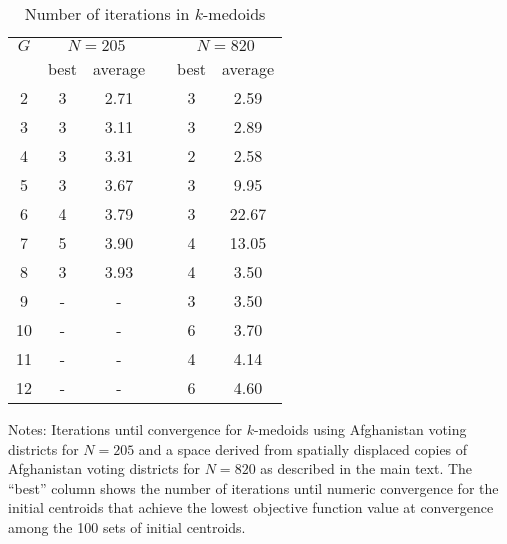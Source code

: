 \documentclass[preprint]{imsart}
\numberwithin{equation}{section}
\theoremstyle{plain}
\theoremstyle{definition}
\renewcommand{\(}{\left(}
\renewcommand{\)}{\right)}
\renewcommand{\[}{\left[}
\renewcommand{\]}{\right]}
\begin{document}
{\begin{table}[ht!]
\begin{threeparttable}
\begin{tablenotes}
	\end{tablenotes}
\end{threeparttable}
\end{table}



\begin{table}[ht!]
	\centering
	\renewcommand{\arraystretch}{1.5}
	\caption{Number of iterations in $k$-medoids}
	 \label{kmedoidsiterations}
	\begin{threeparttable}
	\begin{tabular}{cccccc}
		\hline
		\hline
$G$	& \multicolumn{2}{c}{$N=205$} & & \multicolumn{2}{c}{$N=820$}  \\
 \cline{2-3}\cline{5-6}
& best & average & & best & average \\
		\hline
2  & 3 & 2.71 &  & 3 & 2.59  \\
3  & 3 & 3.11 &  & 3 & 2.89  \\
4  & 3 & 3.31 &  & 2 & 2.58  \\
5  & 3 & 3.67 &  & 3 & 9.95  \\
6  & 4 & 3.79 &  & 3 & 22.67 \\
7  & 5 & 3.90 &  & 4 & 13.05 \\
8  & 3 & 3.93 &  & 4 & 3.50  \\
9  & -  &    -  &  & 3 & 3.50  \\
10 &  - &   -   &  & 6 & 3.70  \\
11 &  - &   -   &  & 4 & 4.14  \\
12 &  - & -     &  & 6 & 4.60 \\
\hline
	\end{tabular}
\begin{tablenotes}
\item Notes:  Iterations until convergence for $k$-medoids using Afghanistan voting districts for $N=205$ and a space derived from spatially displaced copies of Afghanistan voting districts for $N=820$ as described in the main text. 
The ``best'' column shows the number of iterations until numeric convergence for the initial centroids that achieve the lowest objective function value at convergence among the 100  sets of initial centroids. 

\end{tablenotes}
\end{threeparttable}
\end{table}}
\end{document}
